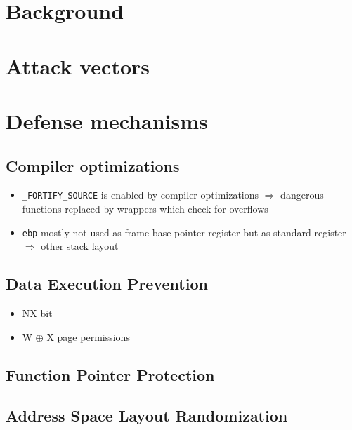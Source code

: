 \chapter{Background}
\label{chp:background}

\chapter{Attack vectors}
\label{chp:attack-vectors}

\chapter{Defense mechanisms}
\label{chp:defense-mechanisms}

\section{Compiler optimizations}
\label{sec:compiler-optimizations}

\begin{itemize}
	\item{
		\texttt{\_FORTIFY\_SOURCE} is enabled by compiler optimizations $\Rightarrow$ dangerous functions replaced by wrappers which check for overflows
	}
	\item{
		\texttt{ebp} mostly not used as frame base pointer register but as standard register $\Rightarrow$ other stack layout
	}
\end{itemize}

\section{Data Execution Prevention}
\label{sec:dep}

\begin{itemize}
	\item{NX bit}
	\item{W $ \oplus $ X page permissions}
\end{itemize}

\section{Function Pointer Protection}
\label{sec:fpp}

\section{Address Space Layout Randomization}
\label{sec:aslr}

